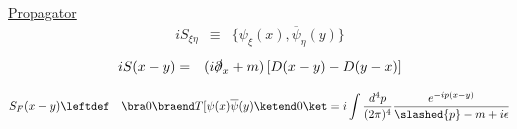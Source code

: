 \bigskip

\noindent
\underline{Propagator}\\
\begin{eqnarray}
i S_{\xi \eta} &\equiv&
\{
\psi_\xi (x) , \overline{\psi}_\eta (y) \}
\end{eqnarray}
\begin{eqnarray}
iS(x - y)
&=& 
(i \slashed{\partial}_x + m)
\left[
D(x-y) - D(y - x)
\right]
\end{eqnarray}

\begin{eqnarray}
S_F(x - y) &\leftdef&
\bra 0 \braend T[ \psi(x) \overline{\psi}(y) \ketend 0 \ket
=
i \int \frac{d^4 p}{(2\pi)^4}
\frac{e^{-ip(x-y)}}{\slashed{p} - m + i\epsilon}
\end{eqnarray}
\begin{comment}
\begin{eqnarray}
S_F(q) &=& i \int d^4x e^{iqx}
\bra 0 \braend T[\psi(x) \bar{\psi}(0)]
\ketend 0 \ket
\nonumber\\
&=&
\frac{-1}{\slashed{q} - m + i \epsilon}
=
- \frac{\slashed{q} + m}{ q^2 - m^2 + i \epsilon}
\end{eqnarray}
\end{comment}

\begin{comment}
\subsubsection{Majorana Field}
Massless, spin1/2, selfconjugate.
\begin{equation}
i \slashed{\partial} \psi(x) = 0\,,
\hspace{3mm}
\bar{\psi}(x) i \stackrel{\leftarrow}{\slashed{\partial}}   = 0
\end{equation}
\end{comment}

